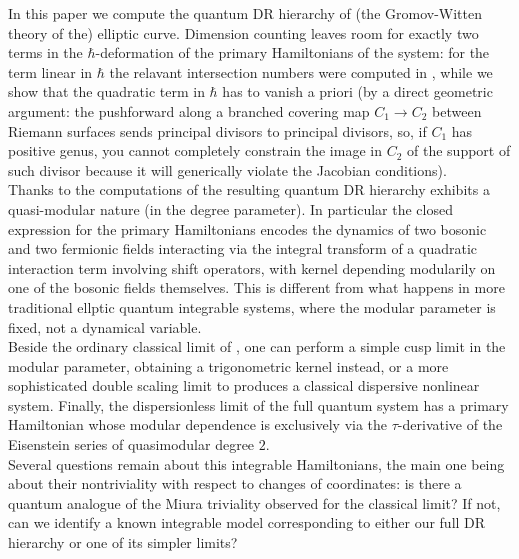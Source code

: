 \documentclass{amsart}
\numberwithin{equation}{section} %
\theoremstyle{plain}
\theoremstyle{remark}
\begin{document}
In this paper we compute the quantum DR hierarchy of (the Gromov-Witten theory of the) elliptic curve. Dimension counting leaves room for exactly two terms in the $\hbar$-deformation of the primary Hamiltonians of the system: for the term linear in $\hbar$ the relavant intersection numbers were computed in \cite{pixton_oberdieck_23}, while we show that the quadratic term in $\hbar$ has to vanish a priori (by a direct geometric argument: the pushforward along a branched covering map $C_1 \to C_2$ between Riemann surfaces sends principal divisors to principal divisors, so, if $C_1$ has positive genus, you cannot completely constrain the image in $C_2$ of the support of such divisor because it will generically violate the Jacobian conditions).\\

Thanks to the computations of \cite{pixton_oberdieck_23} the resulting quantum DR hierarchy exhibits a quasi-modular nature (in the degree parameter). In particular the closed expression for the primary Hamiltonians encodes the dynamics of two bosonic and two fermionic fields interacting via the integral transform of a quadratic interaction term involving shift operators, with kernel depending modularily on one of the bosonic fields themselves. This is different from what happens in more traditional ellptic quantum integrable systems, where the modular parameter is fixed, not a dynamical variable.\\

Beside the ordinary classical limit of \cite{buryak_22}, one can perform a simple cusp limit in the modular parameter, obtaining a trigonometric kernel instead, or a more sophisticated double scaling limit to produces a classical dispersive nonlinear system. Finally, the dispersionless limit of the full quantum system has a primary Hamiltonian whose modular dependence is exclusively via the $\tau$-derivative of the Eisenstein series of quasimodular degree $2$.\\

Several questions remain about this integrable Hamiltonians, the main one being about their nontriviality with respect to changes of coordinates: is there a quantum analogue of the Miura triviality observed for the classical limit? If not, can we identify a known integrable model corresponding to either our full DR hierarchy or one of its simpler limits?\\
 
\end{document}
